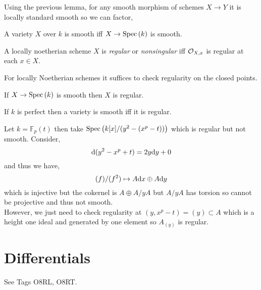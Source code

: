 \documentclass[12pt]{article}
\begin{document}
\begin{rmk}
Using the previous lemma, for any smooth morphism of schemes $X \to Y$ it is locally standard smooth so we can factor,
\begin{center}
\end{center}
\end{rmk}

\begin{defn}
A variety $X$ over $k$ is smooth iff $X \to \mathrm{Spec}\left( k \right)$ is smooth.
\end{defn}

\begin{defn}
A locally noetherian scheme $X$ is \textit{regular} or \textit{nonsingular} iff $\mathcal{O}_{X, x}$ is regular at each $x \in X$.
\end{defn}

\begin{rmk}
For locally Noetherian schemes it suffices to check regularity on the closed points. 
\end{rmk}

\begin{theorem}
If $X \to \mathrm{Spec}\left( k \right)$ is smooth then $X$ is regular. 
\end{theorem}

\begin{theorem}
If $k$ is perfect then a variety is smooth iff it is regular.
\end{theorem}

\begin{example}
Let $k = \mathbb{F}_p(t)$ then take $\mathrm{Spec}\left( k[x]/(y^2 - (x^p - t)) \right)$ which is regular but not smooth. Consider,
\[ \mathrm{d}{(y^2 - x^p + t)} = 2 y \mathrm{d}{y} + 0 \]
and thus we have,
\[ (f)/(f^2) \mapsto A \mathrm{d}{x} \oplus A \mathrm{d}{y} \]
which is injective but the cokernel is $A \oplus A / y A$ but $A / y A$ has torsion so cannot be projective and thus not smooth.
\bigskip\\
However, we just need to check regularity at $(y, x^p - t) = (y) \subset A$ which is a height one ideal and generated by one element so $A_{(y)}$ is regular.  
\end{example}

\section{Differentials}
\begin{rmk}
See Tags O8RL, O8RT.
\end{rmk}
\end{document}
